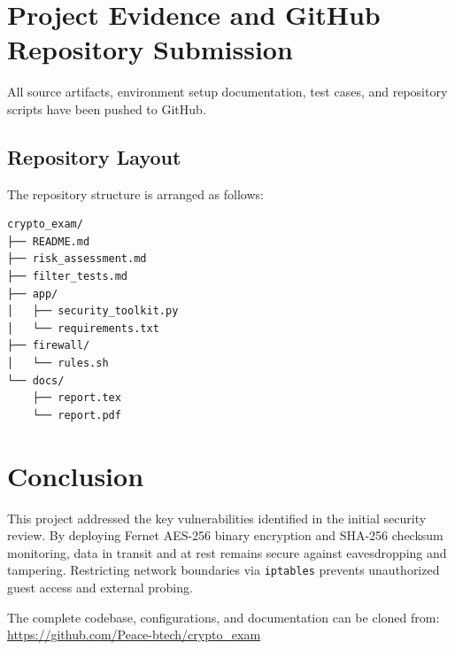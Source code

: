 \documentclass[12pt,a4paper]{article}
\begin{document}
\section{Project Evidence and GitHub Repository Submission}
All source artifacts, environment setup documentation, test cases, and repository scripts have been pushed to GitHub.

\subsection{Repository Layout}
The repository structure is arranged as follows:
\begin{verbatim}
crypto_exam/
├── README.md
├── risk_assessment.md
├── filter_tests.md
├── app/
│   ├── security_toolkit.py
│   └── requirements.txt
├── firewall/
│   └── rules.sh
└── docs/
    ├── report.tex
    └── report.pdf
\end{verbatim}

\section{Conclusion}
This project addressed the key vulnerabilities identified in the initial security review. By deploying Fernet AES-256 binary encryption and SHA-256 checksum monitoring, data in transit and at rest remains secure against eavesdropping and tampering. Restricting network boundaries via \texttt{iptables} prevents unauthorized guest access and external probing.

The complete codebase, configurations, and documentation can be cloned from: \\
\url{https://github.com/Peace-btech/crypto_exam}
\end{document}
